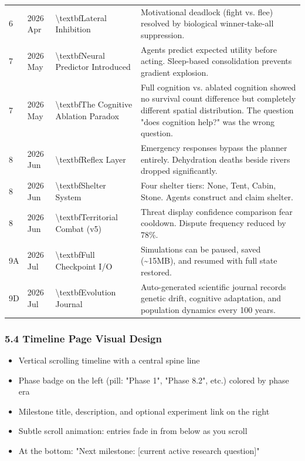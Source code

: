 \documentclass[11pt,a4paper]{article}
\begin{document}
\begin{longtable}{llll}
6 & 2026 Apr & \textbackslash{}textbf{Lateral Inhibition} & Motivational deadlock (fight vs. flee) resolved by biological winner-take-all suppression. \\
7 & 2026 May & \textbackslash{}textbf{Neural Predictor Introduced} & Agents predict expected utility before acting. Sleep-based consolidation prevents gradient explosion. \\
7 & 2026 May & \textbackslash{}textbf{The Cognitive Ablation Paradox} & Full cognition vs. ablated cognition showed no survival count difference  but completely different spatial distribution. The question "does cognition help?" was the wrong question. \\
8 & 2026 Jun & \textbackslash{}textbf{Reflex Layer} & Emergency responses bypass the planner entirely. Dehydration deaths beside rivers dropped significantly. \\
8 & 2026 Jun & \textbackslash{}textbf{Shelter System} & Four shelter tiers: None, Tent, Cabin, Stone. Agents construct and claim shelter. \\
8 & 2026 Jun & \textbackslash{}textbf{Territorial Combat (v5)} & Threat display  confidence comparison  fear cooldown. Dispute frequency reduced by 78\%. \\
9A & 2026 Jul & \textbackslash{}textbf{Full Checkpoint I/O} & Simulations can be paused, saved (\textasciitilde{}15MB), and resumed with full state restored. \\
9D & 2026 Jul & \textbackslash{}textbf{Evolution Journal} & Auto-generated scientific journal records genetic drift, cognitive adaptation, and population dynamics every 100 years. \\
\bottomrule
\end{longtable}

\subsubsection*{5.4 Timeline Page Visual Design}

\begin{itemize}
  \item Vertical scrolling timeline with a central spine line
  \item Phase badge on the left (pill: "Phase 1", "Phase 8.2", etc.) colored by phase era
  \item Milestone title, description, and optional experiment link on the right
  \item Subtle scroll animation: entries fade in from below as you scroll
  \item At the bottom: "Next milestone: [current active research question]"
\end{itemize}
\end{document}
